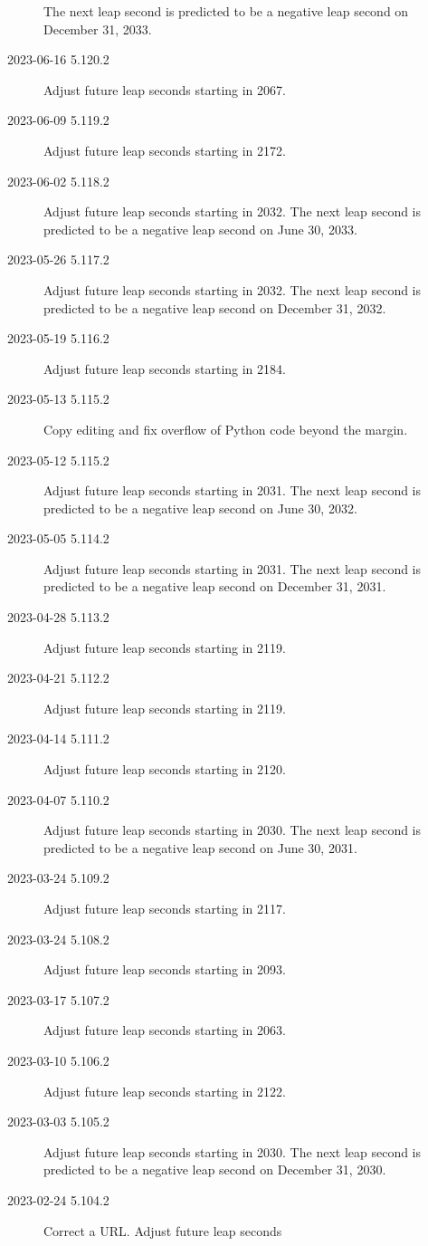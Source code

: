 \documentclass[letterpaper,twoside]{article}
\begin{document}
\begin{description}
  The next leap second is predicted to be a negative leap second
  on December 31, 2033.
\item[2023-06-16 5.120.2]Adjust future leap seconds starting in 2067.
\item[2023-06-09 5.119.2]Adjust future leap seconds starting in 2172.
\item[2023-06-02 5.118.2]Adjust future leap seconds starting in 2032.
  The next leap second is predicted to be a negative leap second
  on June 30, 2033.
\item[2023-05-26 5.117.2]Adjust future leap seconds starting in 2032.
  The next leap second is predicted to be a negative leap second
  on December 31, 2032.
\item[2023-05-19 5.116.2]Adjust future leap seconds starting in 2184.
\item[2023-05-13 5.115.2]Copy editing and fix overflow of Python code
  beyond the margin.
\item[2023-05-12 5.115.2]Adjust future leap seconds starting in 2031.
  The next leap second is predicted to be a negative leap second
  on June 30, 2032.
\item[2023-05-05 5.114.2]Adjust future leap seconds starting in 2031.
  The next leap second is predicted to be a negative leap second
  on December 31, 2031.
\item[2023-04-28 5.113.2]Adjust future leap seconds starting in 2119.
\item[2023-04-21 5.112.2]Adjust future leap seconds starting in 2119.
\item[2023-04-14 5.111.2]Adjust future leap seconds starting in 2120.
\item[2023-04-07 5.110.2]Adjust future leap seconds starting in 2030.
  The next leap second is predicted to be a negative leap second
  on June 30, 2031.
\item[2023-03-24 5.109.2]Adjust future leap seconds starting in 2117.
\item[2023-03-24 5.108.2]Adjust future leap seconds starting in 2093.
\item[2023-03-17 5.107.2]Adjust future leap seconds starting in 2063.
\item[2023-03-10 5.106.2]Adjust future leap seconds starting in 2122.
\item[2023-03-03 5.105.2]Adjust future leap seconds starting in 2030.
  The next leap second is predicted to be a negative leap second
  on December 31, 2030.
\item[2023-02-24 5.104.2]Correct a URL.  Adjust future leap seconds

\end{description}
\end{document}
